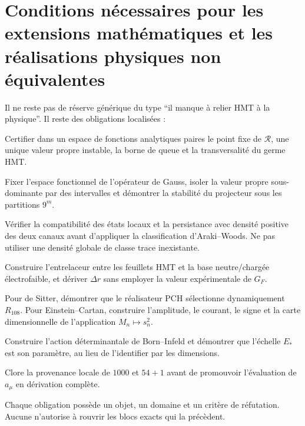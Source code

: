 \section{Conditions nécessaires pour les extensions mathématiques et les réalisations physiques non équivalentes}

Il ne reste pas de réserve générique du type ``il manque à relier HMT à la
physique''. Il reste des obligations localisées :

\begin{description}[style=nextline,leftmargin=37mm]
\item[CHAOS-OBL-1]
Certifier dans un espace de fonctions analytiques paires le point fixe de
\(\mathcal R\), une unique valeur propre instable, la borne de queue et la
transversalité du germe HMT.

\item[GAUSS-OBL-1]
Fixer l'espace fonctionnel de l'opérateur de Gauss, isoler la valeur propre
sous-dominante par des intervalles et démontrer la stabilité du projecteur sous les
partitions \(9^m\).

\item[HMOD-OBL-1]
Vérifier la compatibilité des états locaux et la persistance avec
densité positive des deux canaux avant d'appliquer la classification
d'Araki--Woods. Ne pas utiliser une densité globale de classe trace inexistante.

\item[EW-OBL-1]
Construire l'entrelaceur entre les feuillets HMT et la base neutre/chargée électrofaible,
et dériver \(\Delta r\) sans employer la valeur expérimentale de \(G_F\).

\item[COS-OBL-1]
Pour de Sitter, démontrer que le réalisateur PCH sélectionne dynamiquement
\(R_{108}\). Pour Einstein--Cartan, construire l'amplitude, le courant, le signe et la
carte dimensionnelle de l'application \(M_n\mapsto s_n^2\).

\item[BORN-OBL-1]
Construire l'action déterminantale de Born--Infeld et démontrer que l'échelle
\(E_*\) est son paramètre, au lieu de l'identifier par les dimensions.

\item[ANOM-OBL-1]
Clore la provenance locale de \(1000\) et \(54+1\) avant de promouvoir
l'évaluation de \(a_\mu\) en dérivation complète.
\end{description}

Chaque obligation possède un objet, un domaine et un critère de réfutation. Aucune n'autorise à
rouvrir les blocs exacts qui la précèdent.

